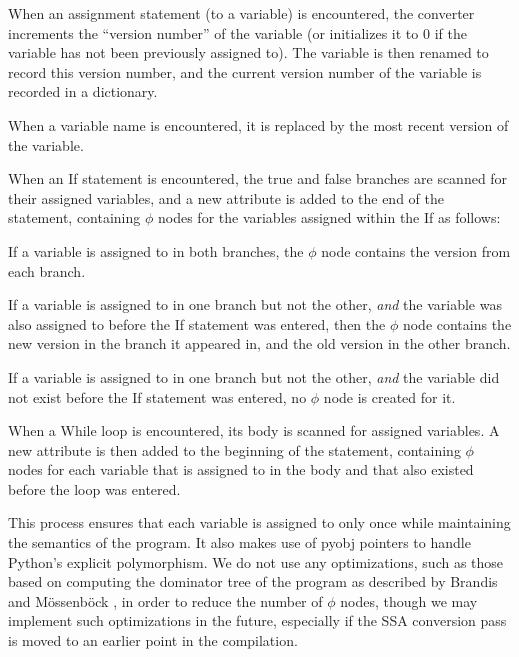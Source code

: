 \documentclass[11pt,twocolumn]{article}
\newenvironment{packed_enum}{
\begin{enumerate}
  \setlength{\itemsep}{1pt}
  \setlength{\parskip}{0pt}
  \setlength{\parsep}{0pt}
}{\end{enumerate}}
\begin{document}
\begin{packed_enum}
\item When an assignment statement (to a variable) is encountered, the
  converter increments the ``version number'' of the variable (or
  initializes it to $0$ if the variable has not been previously
  assigned to). The variable is then renamed to record this version
  number, and the current version number of the variable is recorded
  in a dictionary.
\item When a variable name is encountered, it is replaced by the most
  recent version of the variable.
\item When an If statement is encountered, the true and false branches
  are scanned for their assigned variables, and a new attribute is
  added to the end of the statement, containing $\phi$ nodes for the
  variables assigned within the If as follows:
  \begin{packed_enum}
  \item If a variable is assigned to in both branches, the $\phi$ node
    contains the version from each branch.
  \item If a variable is assigned to in one branch but not the other,
    \textit{and} the variable was also assigned to before the If
    statement was entered, then the $\phi$ node contains the new version
    in the branch it appeared in, and the old version in the other
    branch.
  \item If a variable is assigned to in one branch but not the other,
    \textit{and} the variable did not exist before the If
    statement was entered, no $\phi$ node is created for it.
  \end{packed_enum}
\item When a While loop is encountered, its body is scanned for
  assigned variables. A new attribute is then added to the beginning
  of the statement, containing $\phi$ nodes for each variable that is
  assigned to in the body and that also existed before the loop was
  entered.
\end{packed_enum}

This process ensures that each variable is assigned to only once while
maintaining the semantics of the program. It also makes use of pyobj
pointers to handle Python's explicit polymorphism. We do not use any
optimizations, such as those based on computing the dominator tree of
the program as described by Brandis and M\"{o}ssenb\"{ock}
\cite{brandis-mossenbock}, in order to reduce the number of $\phi$ nodes,
though we may implement such optimizations in the future, especially
if the SSA conversion pass is moved to an earlier point in the
compilation.
\end{document}
